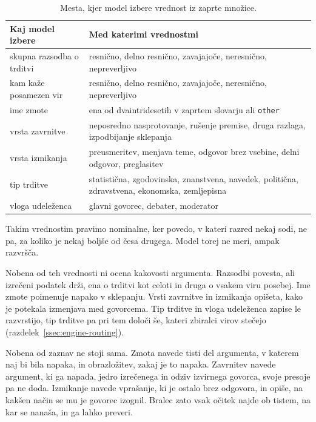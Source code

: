 \documentclass[a4paper, 12pt]{book}
\begin{document}
\begin{table}[H]
\centering
\small
{}
\begin{tabular}{@{}p{}p{}@{}}
\toprule
Kaj model izbere & Med katerimi vrednostmi \\
\midrule
skupna razsodba o trditvi & resnično, delno resnično, zavajajoče, neresnično, nepreverljivo \\
\midrule
kam kaže posamezen vir & resnično, delno resnično, zavajajoče, neresnično, nepreverljivo \\
\midrule
ime zmote & ena od dvaintridesetih v zaprtem slovarju ali \texttt{other} \\
\midrule
vrsta zavrnitve & neposredno nasprotovanje, rušenje premise, druga razlaga, izpodbijanje sklepanja \\
\midrule
vrsta izmikanja & preusmeritev, menjava teme, odgovor brez vsebine, delni odgovor, preglasitev \\
\midrule

tip trditve & statistična, zgodovinska, znanstvena, navedek, politična, zdravstvena, ekonomska, zemljepisna \\
\midrule
vloga udeleženca & glavni govorec, debater, moderator \\
\bottomrule
\end{tabular}
\caption{Mesta, kjer model izbere vrednost iz zaprte množice.}
\label{tbl:zaprte}
\end{table}

Takim vrednostim pravimo nominalne, ker povedo, v kateri razred nekaj sodi, ne
pa, za koliko je nekaj boljše od česa drugega. Model torej ne meri, ampak
razvršča.

Nobena od teh vrednosti ni ocena kakovosti argumenta. Razsodbi povesta, ali
izrečeni podatek drži, ena o trditvi kot celoti in druga o vsakem viru posebej.
Ime zmote poimenuje napako v sklepanju. Vrsti zavrnitve in izmikanja opišeta,
kako je potekala izmenjava med govorcema. Tip trditve in vloga udeleženca zapise le razvrstijo, tip trditve pa pri tem določi še, kateri
zbiralci virov stečejo (razdelek~\ref{ssec:engine-routing}).

Nobena od zaznav ne stoji sama. Zmota navede tisti del argumenta, v katerem
naj bi bila napaka, in obrazložitev, zakaj je to napaka. Zavrnitev navede
argument, ki ga napada, jedro izrečenega in odziv izvirnega govorca, svoje
presoje pa ne doda. Izmikanje navede vprašanje, ki je ostalo brez odgovora, in
opiše, na kakšen način se mu je govorec izognil. Bralec zato vsak očitek najde
ob tistem, na kar se nanaša, in ga lahko preveri.
\end{document}
